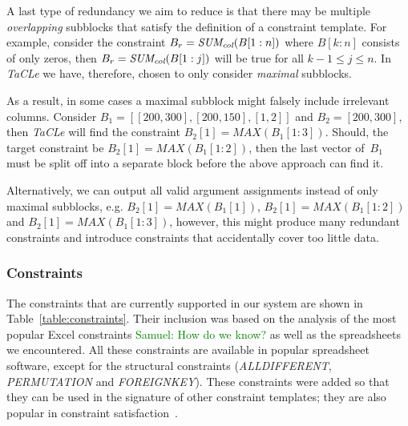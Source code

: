 \documentclass{IEEEtran}
\newcommand{\samuel}[1]{\textcolor{green}{{\sc Samuel:} #1}\xspace}
\newcommand{\format}[1]{\textit{#1}\xspace}
\newcommand{\sname}{\format{TaCLe}}
\newcommand{\CSignature}{Signature\xspace}
\newcommand{\eccalc}[2]{\ensuremath{#1 = #2}}
\newcommand{\ecsumc}[2]{\eccalc{#1}{\textit{SUM\textsubscript{col}}(#2)}}
\theoremstyle{definition}
\begin{document}
A last type of redundancy we aim to reduce is that there may be multiple \textit{overlapping} subblocks that satisfy the definition of a constraint template.
For example, consider the constraint \ecsumc{B_r}{B[1:n]} where $B[k:n]$ consists of only zeros, then \ecsumc{B_r}{B[1:j]} will be true for all $k - 1 \leq j \leq n$.
In \sname we have, therefore, chosen to only consider \textit{maximal} subblocks.

As a result, in some cases a maximal subblock might falsely include irrelevant columns.
Consider $B_1 = [[200, 300], [200, 150], [1, 2]]$ and $B_2 = [200, 300]$, then \sname will find the constraint $\eccalc{B_2[1]}{\mathit{MAX}(B_1[1:3])}$.
Should, the target constraint be $\eccalc{B_2[1]}{\mathit{MAX}(B_1[1:2])}$, then the last vector of~$B_1$ must be split off into a separate block before the above approach can find it.

Alternatively, we can output all valid argument assignments instead of only maximal subblocks, e.g. $\eccalc{B_2[1]}{\mathit{MAX}(B_1[1])}$, $\eccalc{B_2[1]}{\mathit{MAX}(B_1[1:2])}$ and $\eccalc{B_2[1]}{\mathit{MAX}(B_1[1:3])}$, however, this might produce many redundant constraints and introduce constraints that accidentally cover too little data.





\subsubsection{Constraints}
The constraints that are currently supported in our system are shown in Table~\ref{table:constraints}.
Their inclusion was based on the analysis of the most popular Excel constraints \samuel{How do we know?} as well as the spreadsheets we encountered.
All these constraints are available in popular spreadsheet software, except for the structural constraints (\textit{ALLDIFFERENT}, \textit{PERMUTATION} and \textit{FOREIGNKEY}).
These constraints were added so that they can be used in the signature of other constraint templates; they are also popular in constraint satisfaction~\cite{modelseeker}.


\end{document}
